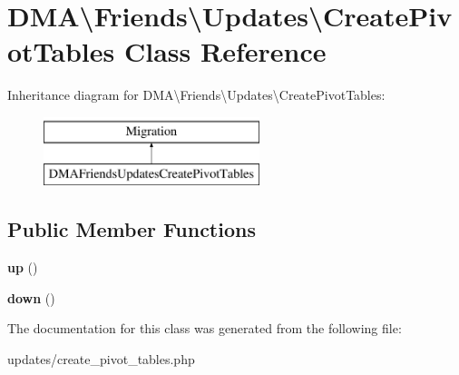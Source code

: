 \hypertarget{classDMA_1_1Friends_1_1Updates_1_1CreatePivotTables}{\section{D\-M\-A\textbackslash{}Friends\textbackslash{}Updates\textbackslash{}Create\-Pivot\-Tables Class Reference}
\label{classDMA_1_1Friends_1_1Updates_1_1CreatePivotTables}
}
Inheritance diagram for D\-M\-A\textbackslash{}Friends\textbackslash{}Updates\textbackslash{}Create\-Pivot\-Tables\-:\begin{figure}[H]
\begin{center}
\leavevmode
\includegraphics[height=2.000000cm]{d4/d12/classDMA_1_1Friends_1_1Updates_1_1CreatePivotTables}
\end{center}
\end{figure}
\subsection*{Public Member Functions}
\begin{DoxyCompactItemize}
\item 
\hypertarget{classDMA_1_1Friends_1_1Updates_1_1CreatePivotTables_ac0f8817b43338e4e215cdfb0318a5207}{{\bfseries up} ()}\label{classDMA_1_1Friends_1_1Updates_1_1CreatePivotTables_ac0f8817b43338e4e215cdfb0318a5207}

\item 
\hypertarget{classDMA_1_1Friends_1_1Updates_1_1CreatePivotTables_ab518b87c73bb4f6a8056601f253925ca}{{\bfseries down} ()}\label{classDMA_1_1Friends_1_1Updates_1_1CreatePivotTables_ab518b87c73bb4f6a8056601f253925ca}

\end{DoxyCompactItemize}


The documentation for this class was generated from the following file\-:\begin{DoxyCompactItemize}
\item 
updates/create\-\_\-pivot\-\_\-tables.\-php\end{DoxyCompactItemize}

